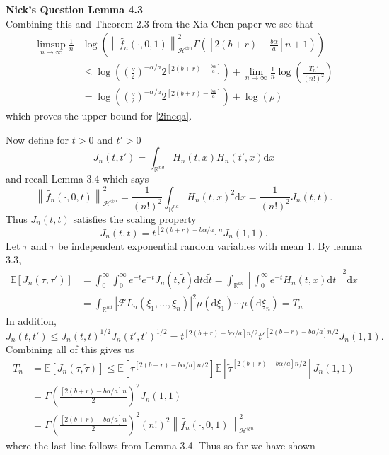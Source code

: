 \documentclass[a4paper,11pt]{article}
\numberwithin{equation}{section}
\theoremstyle{plain}
\theoremstyle{definition}
\newcommand{\ud}{\ensuremath{\mathrm{d} }}
\newcommand{\Norm}[1]{\left\|  #1   \right\|}
\newcommand{\R}{\mathbb{R}}
\newcounter{NQ}
\newenvironment{NickQuestion}[1][] %
{\refstepcounter{NQ}
	\begin{mdframed}[backgroundcolor=lightgray]\textbf{Nick's Question \theNQ \: #1~~}~~~\noindent}%
	{\end{mdframed}}
\numberwithin{NQ}{section}
\numberwithin{LQ}{section}
\numberwithin{ZQ}{section}
\begin{document}
\begin{NickQuestion}[Lemma 4.3]
\[		\]
		Combining this and Theorem 2.3 from the Xia Chen paper we see that
		\begin{align*}
		\limsup_{n \to \infty} \frac{1}{n}& \log\left( \Norm{ \tilde{f_n}(\cdot,0,1) }_{ \mathcal{H}^{\otimes n} }^2 \Gamma\left( \left[ 2(b+r)- \frac{b \alpha}{a} \right] n +1 \right)  \right)
		\\	&\le \log\left( \left( \frac{\nu}{2} \right)^{-\alpha/a}  2^{\left[2(b+r)-\frac{b\alpha}{a}\right]} \right) + \lim_{n \to \infty} \frac{1}{n} \log\left( \frac{T_n'}{(n!)^2} \right)
		\\& = \log\left( \left( \frac{\nu}{2} \right)^{-\alpha/a}  2^{\left[2(b+r)-\frac{b\alpha}{a}\right]} \right)  + \log(\rho)
		\end{align*}
		which proves the upper bound for \ref{2ineqa}.

		Now define for $t>0$ and $t'>0$
		\[
		J_n(t,t') = \int_{\R^{nd}} H_n(t,x)H_n(t',x) \ud x
		\]
		and recall Lemma 3.4 which says
		\[
		\Norm{\tilde{f_n}(\cdot,0,t)}_{\mathcal{H}^{\otimes n}}^2 = \frac{1}{(n!)^2} \int_{\R^{nd}} H_n(t,x)^2\ud x = \frac{1}{(n!)^2} J_n(t,t).
		\]
		Thus $J_n(t,t)$ satisfies the scaling property
		\[
		J_n(t,t) =  t^{[2(b + r ) -b \alpha / a]n} J_n(1,1).
		\]
		Let $\tau$ and $\tilde{\tau}$ be independent exponential random variables with mean 1. By lemma 3.3,
		\begin{align*}
		\mathbb{E}[J_n(\tau, \tau')] &= \int_0^\infty \int_0^\infty e^{-t}e^{-\tilde{t}}J_n(t,\tilde{t}) \ud t \ud \tilde{t} = \int_{\R^{dn}}\left[ \int_0^\infty e^{-t}H_n(t,x) \ud t \right]^2 \ud x
		\\&= \int_{\R^{nd}} |\mathcal{F}L_n(\xi_1,...,\xi_n)|^2 \mu(\ud \xi_1) \cdots \mu(\ud \xi_n) = T_n
		\end{align*}
		In addition,
		\[
		J_n(t,t') \le J_n(t,t)^{1/2}J_n(t',t')^{1/2} =  t^{[2(b + r ) -b \alpha / a]n/2} {t'}^{[2(b + r ) -b \alpha / a]n/2} J_n(1,1).
		\]
		Combining all of this gives us
		\begin{align*}
		T_n & = \mathbb{E}[J_n(\tau,\tilde{\tau})] \le \mathbb{E}\left[  {\tau}^{[2(b + r ) -b \alpha / a]n/2} \right] \mathbb{E}\left[  {\tilde{\tau}}^{[2(b + r ) -b \alpha / a]n/2} \right]J_n(1,1)
		\\& = \Gamma\left( \frac{[2(b + r ) -b \alpha / a]n}{2} \right)^2 J_n(1,1)
		\\& = \Gamma\left( \frac{[2(b + r ) -b \alpha / a]n}{2} \right)^2 (n!)^2	\Norm{ \tilde{f_n}(\cdot,0,1) }_{ \mathcal{H}^{\otimes n} }^2
		\end{align*}
		where the last line follows from Lemma 3.4. Thus so far we have shown

\end{NickQuestion}
\end{document}
